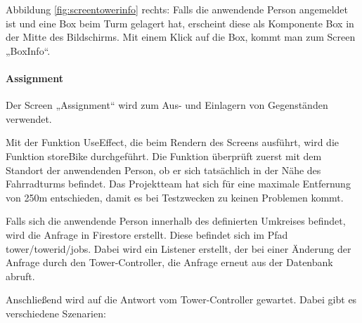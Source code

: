 \noindent Abbildung \ref{fig:screentowerinfo} rechts: Falls die anwendende Person angemeldet ist und eine Box beim Turm gelagert hat, erscheint diese als Komponente Box in der Mitte des Bildschirms. Mit einem Klick auf die Box, kommt man zum Screen „BoxInfo“.

\bigskip


\paragraph{Assignment}Der Screen „Assignment“ wird zum Aus- und Einlagern von Gegenständen verwendet.

\noindent Mit der Funktion UseEffect, die beim Rendern des Screens ausführt, wird die Funktion storeBike durchgeführt. Die Funktion überprüft zuerst mit dem Standort der anwendenden Person, ob er sich tatsächlich in der Nähe des Fahrradturms befindet. Das Projektteam hat sich für eine maximale Entfernung von 250m entschieden, damit es bei Testzwecken zu keinen Problemen kommt.

\noindent Falls sich die anwendende Person innerhalb des definierten Umkreises befindet, wird die Anfrage in Firestore erstellt. Diese befindet sich im Pfad tower/towerid/jobs. Dabei wird ein Listener erstellt, der bei einer Änderung der Anfrage durch den Tower-Controller, die Anfrage erneut aus der Datenbank abruft.

\noindent Anschließend wird auf die Antwort vom Tower-Controller gewartet. Dabei gibt es verschiedene Szenarien:

